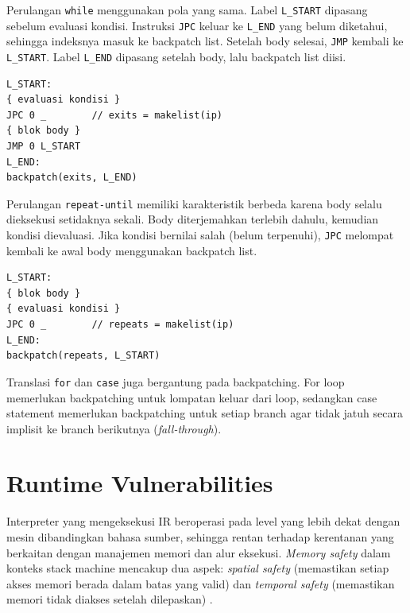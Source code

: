 Perulangan \texttt{while} menggunakan pola yang sama. Label \texttt{L\_START} dipasang sebelum evaluasi kondisi. Instruksi \texttt{JPC} keluar ke \texttt{L\_END} yang belum diketahui, sehingga indeksnya masuk ke backpatch list. Setelah body selesai, \texttt{JMP} kembali ke \texttt{L\_START}. Label \texttt{L\_END} dipasang setelah body, lalu backpatch list diisi.

\begin{tcolorbox}[title=Contoh TAC untuk WHILE,colback=gray!5,colframe=black!60,boxrule=0.5pt,arc=2mm]
\begin{verbatim}
L_START:
{ evaluasi kondisi }
JPC 0 _        // exits = makelist(ip)
{ blok body }
JMP 0 L_START
L_END:
backpatch(exits, L_END)
\end{verbatim}
\end{tcolorbox}

Perulangan \texttt{repeat-until} memiliki karakteristik berbeda karena body selalu dieksekusi setidaknya sekali. Body diterjemahkan terlebih dahulu, kemudian kondisi dievaluasi. Jika kondisi bernilai salah (belum terpenuhi), \texttt{JPC} melompat kembali ke awal body menggunakan backpatch list.

\begin{tcolorbox}[title=Contoh TAC untuk REPEAT-UNTIL,colback=gray!5,colframe=black!60,boxrule=0.5pt,arc=2mm]
\begin{verbatim}
L_START:
{ blok body }
{ evaluasi kondisi }
JPC 0 _        // repeats = makelist(ip)
L_END:
backpatch(repeats, L_START)
\end{verbatim}
\end{tcolorbox}

Translasi \texttt{for} dan \texttt{case} juga bergantung pada backpatching. For loop memerlukan backpatching untuk lompatan keluar dari loop, sedangkan case statement memerlukan backpatching untuk setiap branch agar tidak jatuh secara implisit ke branch berikutnya (\textit{fall-through}).


\section{Runtime Vulnerabilities}

Interpreter yang mengeksekusi IR beroperasi pada level yang lebih dekat dengan mesin dibandingkan bahasa sumber, sehingga rentan terhadap kerentanan yang berkaitan dengan manajemen memori dan alur eksekusi. \textit{Memory safety} dalam konteks stack machine mencakup dua aspek: \textit{spatial safety} (memastikan setiap akses memori berada dalam batas yang valid) dan \textit{temporal safety} (memastikan memori tidak diakses setelah dilepaskan) \cite{aho2007compilers}.

